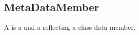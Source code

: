\subsection{MetaDataMember}
\label{concept-MetaDataMember}

A  is a  and a 
reflecting a class data member.


